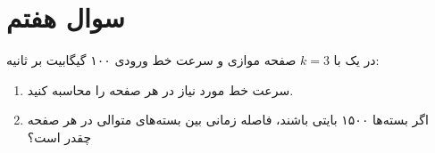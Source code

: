 \section{سوال هفتم}

در یک  با $k=3 $ صفحه موازی و سرعت خط ورودی ۱۰۰ گیگابیت بر ثانیه:

\begin{enumerate}
	\item 
	سرعت خط مورد نیاز در هر صفحه را محاسبه کنید.
	
	\item 
	اگر بسته‌ها ۱۵۰۰ بایتی باشند، فاصله زمانی بین بسته‌های متوالی در هر صفحه چقدر است؟
\end{enumerate}